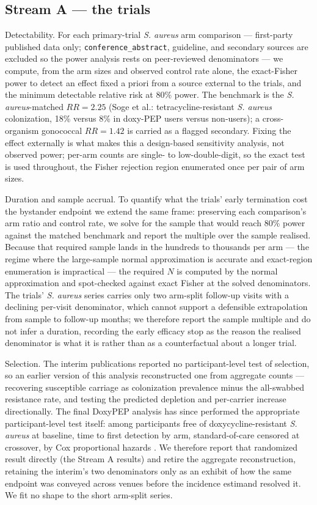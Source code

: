 \documentclass[10pt,letterpaper]{article}
\begin{document}
\subsection*{Stream A --- the trials}

Detectability. For each primary-trial \emph{S. aureus} arm
comparison --- first-party published data only;
\texttt{conference\_abstract}, guideline, and secondary sources are
excluded so the power analysis rests on peer-reviewed denominators ---
we compute, from the arm sizes and observed control rate alone, the
exact-Fisher power to detect an effect fixed a priori from a
source external to the trials, and the minimum detectable relative risk
at 80\% power. The benchmark is the \emph{S. aureus}-matched
\(RR = 2.25\) (Soge et al.: tetracycline-resistant \emph{S. aureus}
colonization, 18\% versus 8\% in doxy-PEP users versus non-users); a
cross-organism gonococcal \(RR = 1.42\) is carried as a flagged
secondary. Fixing the effect externally is what makes this a
design-based sensitivity analysis, not observed power; per-arm
counts are single- to low-double-digit, so the exact test is used
throughout, the Fisher rejection region enumerated once per pair of arm
sizes.

Duration and sample accrual. To quantify what the trials' early
termination cost the bystander endpoint we extend the same frame:
preserving each comparison's arm ratio and control rate, we solve for
the sample that would reach 80\% power against the matched benchmark and
report the multiple over the sample realised. Because that required
sample lands in the hundreds to thousands per arm --- the regime where
the large-sample normal approximation is accurate and exact-region
enumeration is impractical --- the required \(N\) is computed by the
normal approximation and spot-checked against exact Fisher at the solved
denominators. The trials' \emph{S. aureus} series carries only two
arm-split follow-up visits with a declining per-visit denominator, which
cannot support a defensible extrapolation from sample to follow-up
months; we therefore report the sample multiple and do not infer a
duration, recording the early efficacy stop as the reason the realised
denominator is what it is rather than as a counterfactual about a longer
trial.

Selection. The interim publications reported no
participant-level test of selection, so an earlier version of this
analysis reconstructed one from aggregate counts --- recovering
susceptible carriage as colonization prevalence minus the all-swabbed
resistance rate, and testing the predicted depletion and per-carrier
increase directionally. The final DoxyPEP analysis has since performed
the appropriate participant-level test itself: among participants free
of doxycycline-resistant \emph{S. aureus} at baseline, time to first
detection by arm, standard-of-care censored at crossover, by Cox
proportional hazards \cite{luetkemeyer2025}. We therefore report that
randomized result directly (the Stream A results) and retire the
aggregate reconstruction, retaining the interim's two denominators only
as an exhibit of how the same endpoint was conveyed across venues before
the incidence estimand resolved it. We fit no shape to the short
arm-split series.
\end{document}
